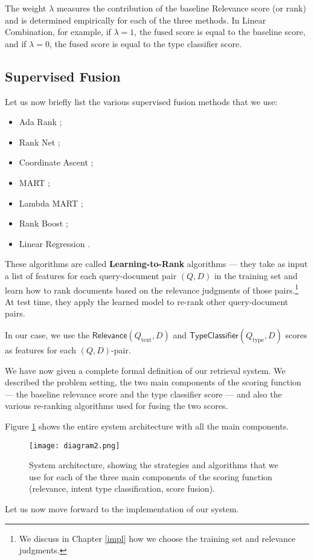 The weight $\lambda$ measures the contribution of the baseline \textsf{Relevance} score (or rank) and
is determined empirically for each of the three methods.
In Linear Combination, for example, if $\lambda=1$, the fused score is equal to the baseline score,
and if $\lambda=0$, the fused score is equal to the type classifier score.

\subsection{Supervised Fusion}\label{sup-fusion}
Let us now briefly list the various supervised fusion methods that we use:
\begin{itemize}
 \item {Ada Rank} \cite{adaRank};
 \item {Rank Net} \cite{rankNet};
 \item {Coordinate Ascent} \cite{coordAscent};
 \item {MART} \cite{mart};
 \item {Lambda MART} \cite{lambda-mart};
 \item {Rank Boost} \cite{rankBoost};
  \item {Linear Regression} \cite{ranklib}.
\end{itemize}

These algorithms are called \textbf{Learning-to-Rank} algorithms ---
they take as input a list of features for each query-document pair $(Q,D)$ in the training
set and learn how to rank documents based on the
relevance judgments of those pairs.\footnote{We discuss in Chapter \ref{impl} how we choose the training set and relevance judgments.}
At test time, they apply the learned model to re-rank other query-document pairs.

In our case, we use the $\textsf{Relevance}(Q_{\text{text}},D)$ and $\textsf{TypeClassifier}(Q_{\text{type}}, D)$
scores as features for each $(Q,D)$-pair.

We have now given a complete formal definition of our retrieval system. We described the problem setting,
the two main components of the scoring function --- the baseline relevance score and the type classifier score ---
and also the various re-ranking algorithms used for fusing the two scores.

Figure \ref{diagram2} shows the entire system architecture with all the main components.

\begin{figure}
\centerline{
  \texttt{[image: diagram2.png]}
  }
  \caption{System architecture, showing the strategies and algorithms that we use for each of the
  three main components of the scoring function (relevance, intent type classification, score fusion).}
  \label{diagram2}
\end{figure}

Let us now move forward to the implementation of our system.


